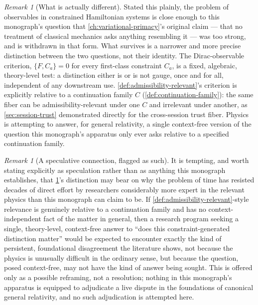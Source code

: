 \documentclass[11pt]{book}
\theoremstyle{plain}
\theoremstyle{definition}
\theoremstyle{remark}
\newtheorem{remark}[theorem]{Remark}
\begin{document}
\begin{remark}[What is actually different]
\label{rem:gauge-vs-admissibility}
Stated this plainly, the problem of observables in constrained
Hamiltonian systems is close enough to this monograph's question that
\cref{ch:variational-primacy}'s original claim --- that no treatment
of classical mechanics asks anything resembling it --- was too strong,
and is withdrawn in that form. What survives is a narrower and more
precise distinction between the two questions, not their identity.
The Dirac-observable criterion, $\{F, C_a\} = 0$ for every first-class
constraint $C_a$, is a fixed, algebraic, theory-level test: a
distinction either is or is not gauge, once and for all, independent
of any downstream use. \cref{def:admissibility-relevant}'s criterion
is explicitly relative to a continuation family $C$
(\cref{def:continuation-family}): the same fiber can be
admissibility-relevant under one $C$ and irrelevant under another, as
\cref{sec:session-trust} demonstrated directly for the cross-session
trust fiber. Physics is attempting to answer, for general relativity,
a single context-free version of the question this monograph's
apparatus only ever asks relative to a specified continuation family.
\end{remark}

\begin{remark}[A speculative connection, flagged as such]
\label{rem:problem-of-time-speculation}
It is tempting, and worth stating explicitly as speculation rather
than as anything this monograph establishes, that
\cref{rem:gauge-vs-admissibility}'s distinction may bear on why the
problem of time has resisted decades of direct effort by researchers
considerably more expert in the relevant physics than this monograph
can claim to be. If \cref{def:admissibility-relevant}-style relevance
is genuinely relative to a continuation family and has no
context-independent fact of the matter in general, then a research
program seeking a single, theory-level, context-free answer to
\enquote{does this constraint-generated distinction matter} would be
expected to encounter exactly the kind of persistent, foundational
disagreement the literature shows, not because the physics is
unusually difficult in the ordinary sense, but because the question,
posed context-free, may not have the kind of answer being sought. This
is offered only as a possible reframing, not a resolution; nothing in
this monograph's apparatus is equipped to adjudicate a live dispute in
the foundations of canonical general relativity, and no such
adjudication is attempted here.
\end{remark}
\end{document}
